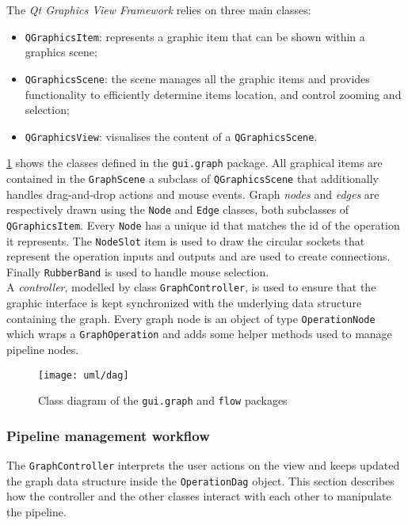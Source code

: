 The \textit{Qt Graphics View Framework} relies on three main classes:
\begin{itemize}
	\item \texttt{QGraphicsItem}: represents a graphic item that can be shown within a graphics scene;
	\item \texttt{QGraphicsScene}: the scene manages all the graphic items and provides functionality to efficiently determine items location, and control zooming and selection;
	\item \texttt{QGraphicsView}: visualises the content of a \texttt{QGraphicsScene}.
\end{itemize}
\cref{fig:daguml} shows the classes defined in the \texttt{gui.graph} package. All graphical items are contained in the \texttt{GraphScene} a subclass of \texttt{QGraphicsScene} that additionally handles drag-and-drop actions and mouse events. Graph \textit{nodes} and \textit{edges} are respectively drawn using the \texttt{Node} and \texttt{Edge} classes, both subclasses of \texttt{QGraphicsItem}. Every \texttt{Node} has a unique id that matches the id of the operation it represents. The \texttt{NodeSlot} item is used to draw the circular sockets that represent the operation inputs and outputs and are used to create connections. Finally \texttt{RubberBand} is used to handle mouse selection.\\
A \textit{controller}, modelled by class \texttt{GraphController}, is used to ensure that the graphic interface is kept synchronized with the underlying data structure containing the graph. Every graph node is an object of type \texttt{OperationNode} which wraps a \texttt{GraphOperation} and adds some helper methods used to manage pipeline nodes.
\begin{figure}
	\centering
	\texttt{[image: uml/dag]}
	\caption{Class diagram of the \texttt{gui.graph} and \texttt{flow} packages}
	\label{fig:daguml}
\end{figure}

\subsubsection{Pipeline management workflow}\label{sssec:pipeline-sequence}
The \texttt{GraphController} interprets the user actions on the view and keeps updated the graph data structure inside the \texttt{OperationDag} object. This section describes how the controller and the other classes interact with each other to manipulate the pipeline.

